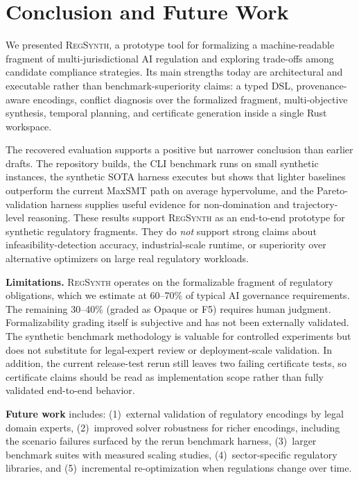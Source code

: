 \documentclass[11pt,twocolumn]{article}
\newcommand{\regsynth}{\textsc{RegSynth}}
\begin{document}
\section{Conclusion and Future Work}
\label{sec:conclusion}

We presented \regsynth{}, a prototype tool for formalizing a machine-readable fragment of multi-jurisdictional AI regulation and exploring trade-offs among candidate compliance strategies. Its main strengths today are architectural and executable rather than benchmark-superiority claims: a typed DSL, provenance-aware encodings, conflict diagnosis over the formalized fragment, multi-objective synthesis, temporal planning, and certificate generation inside a single Rust workspace.

The recovered evaluation supports a positive but narrower conclusion than earlier drafts. The repository builds, the CLI benchmark runs on small synthetic instances, the synthetic SOTA harness executes but shows that lighter baselines outperform the current MaxSMT path on average hypervolume, and the Pareto-validation harness supplies useful evidence for non-domination and trajectory-level reasoning. These results support \regsynth{} as an end-to-end prototype for synthetic regulatory fragments. They do \emph{not} support strong claims about infeasibility-detection accuracy, industrial-scale runtime, or superiority over alternative optimizers on large real regulatory workloads.

\textbf{Limitations.}
\regsynth{} operates on the formalizable fragment of regulatory obligations, which we estimate at 60--70\% of typical AI governance requirements. The remaining 30--40\% (graded as Opaque or F5) requires human judgment. Formalizability grading itself is subjective and has not been externally validated. The synthetic benchmark methodology is valuable for controlled experiments but does not substitute for legal-expert review or deployment-scale validation. In addition, the current release-test rerun still leaves two failing certificate tests, so certificate claims should be read as implementation scope rather than fully validated end-to-end behavior.

\textbf{Future work} includes: (1)~external validation of regulatory encodings by legal domain experts, (2)~improved solver robustness for richer encodings, including the scenario failures surfaced by the rerun benchmark harness, (3)~larger benchmark suites with measured scaling studies, (4)~sector-specific regulatory libraries, and (5)~incremental re-optimization when regulations change over time.
\end{document}
